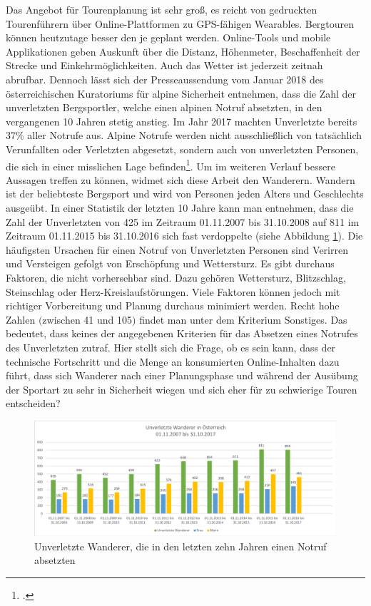 Das Angebot für Tourenplanung ist sehr groß, es reicht von gedruckten Tourenführern über Online-Plattformen zu GPS-fähigen Wearables. Bergtouren können heutzutage besser den je geplant werden. Online-Tools und mobile Applikationen geben Auskunft über die Distanz, Höhenmeter, Beschaffenheit der Strecke und Einkehrmöglichkeiten. Auch das Wetter ist jederzeit zeitnah abrufbar. Dennoch lässt sich der Presseaussendung vom Januar 2018 des österreichischen Kuratoriums für alpine Sicherheit entnehmen, dass die Zahl der unverletzten Bergsportler, welche einen alpinen Notruf absetzten, in den vergangenen 10 Jahren stetig anstieg. Im Jahr 2017 machten Unverletzte bereits 37\% aller Notrufe aus. Alpine Notrufe werden nicht ausschließlich von tatsächlich Verunfallten oder Verletzten abgesetzt, sondern auch von unverletzten Personen, die sich in einer misslichen Lage befinden\footcite{kurasi}.
Um im weiteren Verlauf bessere Aussagen treffen zu können, widmet sich diese Arbeit den Wanderern. Wandern ist der beliebteste Bergsport und wird von Personen jeden Alters und Geschlechts ausgeübt.
In einer Statistik der letzten 10 Jahre kann man entnehmen, dass die Zahl der Unverletzten von 425 im Zeitraum 01.11.2007 bis 31.10.2008 auf 811 im Zeitraum 01.11.2015 bis 31.10.2016 sich fast verdoppelte (siehe Abbildung \ref{fig:uwan}). Die häufigsten Ursachen für einen Notruf von Unverletzten Personen sind {\glqq Verirren und Versteigen\grqq} gefolgt von {\glqq Erschöpfung\grqq}  und {\glqq Wettersturz\grqq}. Es gibt durchaus Faktoren, die nicht vorhersehbar sind. Dazu gehören Wettersturz, Blitzschlag, Steinschlag oder Herz-Kreislaufstörungen. Viele Faktoren können jedoch mit richtiger Vorbereitung und Planung durchaus minimiert werden. Recht hohe Zahlen $($zwischen 41 und 105$)$ findet man unter dem Kriterium {\glqq Sonstiges\grqq}. Das bedeutet, dass keines der angegebenen Kriterien für das Absetzen eines Notrufes des Unverletzten zutraf. Hier stellt sich die Frage, ob es sein kann, dass der technische Fortschritt und die Menge an konsumierten Online-Inhalten dazu führt, dass sich Wanderer nach einer Planungsphase und während der Ausübung der Sportart zu sehr in Sicherheit wiegen und sich eher für zu schwierige Touren entscheiden?
\begin{figure}
	\centering
\includegraphics[width=1\linewidth]{content/uwan}
\caption{Unverletzte Wanderer, die in den letzten zehn Jahren einen Notruf absetzten}
\label{fig:uwan}
\end{figure}




